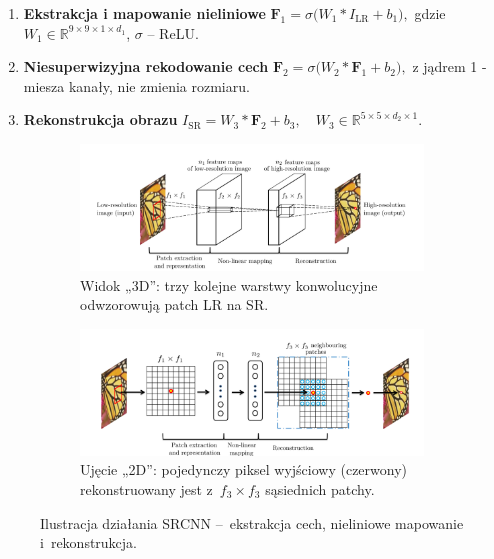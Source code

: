\documentclass[11pt]{article}
\begin{document}
\begin{enumerate}
  \item \textbf{Ekstrakcja i mapowanie nieliniowe}  
        \(\displaystyle
          \mathbf{F}_1 = \sigma\!\bigl(W_1 * I_\mathrm{LR} + b_1\bigr),
        \)
        gdzie $W_1\in\mathbb R^{9\times9\times1\times d_1}$,
        $\sigma$ – ReLU.
  \item \textbf{Niesuperwizyjna rekodowanie cech}  
        \(\displaystyle
          \mathbf{F}_2 = \sigma\!\bigl(W_2 * \mathbf{F}_1 + b_2\bigr),
        \)
        z jądrem 1 - miesza kanały, nie zmienia rozmiaru.
  \item \textbf{Rekonstrukcja obrazu}  
        \(\displaystyle
          I_\mathrm{SR} = W_3 * \mathbf{F}_2 + b_3, \quad
          W_3\in\mathbb R^{5\times5\times d_2\times1}.
        \)
\end{enumerate}

\begin{figure}[H]
  \centering
  \captionsetup[subfigure]{justification=centering}

  \begin{subfigure}{.95\linewidth}
    \centering
    \includegraphics[width=\linewidth]{images/graph1.png} 
    \caption{Widok „3D”: trzy kolejne warstwy konwolucyjne
             odwzorowują patch LR na SR.}
  \end{subfigure}

  \medskip

  \begin{subfigure}{.95\linewidth}
    \centering
    \includegraphics[width=\linewidth]{images/graph2.png} 
    \caption{Ujęcie „2D”: pojedynczy piksel wyjściowy (czerwony)
             rekonstruowany jest z~$f_3\times f_3$ sąsiednich patchy.}
  \end{subfigure}

  \caption{Ilustracja działania SRCNN –~ekstrakcja cech,
           nieliniowe mapowanie i~rekonstrukcja.}
  \label{fig:srcnn_diagrams}
\end{figure}
\end{document}
